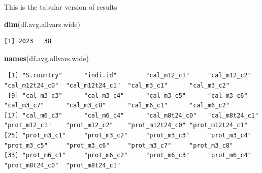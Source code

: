 \documentclass[
]{book}
\newenvironment{Shaded}{\begin{snugshade}}{\end{snugshade}}
\newcommand{\DataTypeTok}[1]{\textcolor[rgb]{0.13,0.29,0.53}{#1}}
\newcommand{\KeywordTok}[1]{\textcolor[rgb]{0.13,0.29,0.53}{\textbf{#1}}}
\newcommand{\NormalTok}[1]{#1}
\newcommand{\OperatorTok}[1]{\textcolor[rgb]{0.81,0.36,0.00}{\textbf{#1}}}
\newcommand{\OtherTok}[1]{\textcolor[rgb]{0.56,0.35,0.01}{#1}}
\newcommand{\StringTok}[1]{\textcolor[rgb]{0.31,0.60,0.02}{#1}}
\begin{document}
\begin{Shaded}
\end{Shaded}

This is the tabular version of results

\begin{Shaded}
\begin{Highlighting}[]
\KeywordTok{dim}\NormalTok{(df.avg.allvars.wide)}
\end{Highlighting}
\end{Shaded}

\begin{verbatim}
[1] 2023   38
\end{verbatim}

\begin{Shaded}
\begin{Highlighting}[]
\KeywordTok{names}\NormalTok{(df.avg.allvars.wide)}
\end{Highlighting}
\end{Shaded}

\begin{verbatim}
 [1] "S.country"      "indi.id"        "cal_m12_c1"     "cal_m12_c2"     "cal_m12t24_c0"  "cal_m12t24_c1"  "cal_m3_c1"      "cal_m3_c2"     
 [9] "cal_m3_c3"      "cal_m3_c4"      "cal_m3_c5"      "cal_m3_c6"      "cal_m3_c7"      "cal_m3_c8"      "cal_m6_c1"      "cal_m6_c2"     
[17] "cal_m6_c3"      "cal_m6_c4"      "cal_m8t24_c0"   "cal_m8t24_c1"   "prot_m12_c1"    "prot_m12_c2"    "prot_m12t24_c0" "prot_m12t24_c1"
[25] "prot_m3_c1"     "prot_m3_c2"     "prot_m3_c3"     "prot_m3_c4"     "prot_m3_c5"     "prot_m3_c6"     "prot_m3_c7"     "prot_m3_c8"    
[33] "prot_m6_c1"     "prot_m6_c2"     "prot_m6_c3"     "prot_m6_c4"     "prot_m8t24_c0"  "prot_m8t24_c1" 
\end{verbatim}
\end{document}
